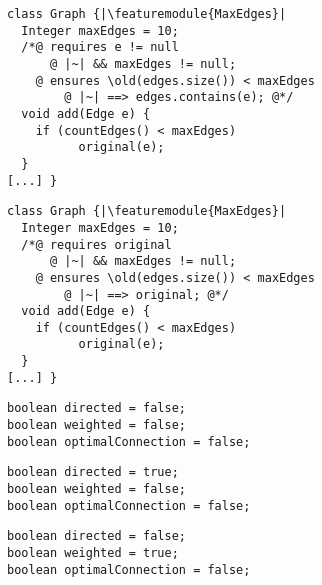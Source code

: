 \newsavebox{\ecrmaxco}
\begin{lrbox}{\ecrmaxco}
	\begin{minipage}{62mm}
\begin{lstlisting}
class Graph {|\featuremodule{MaxEdges}|
  Integer maxEdges = 10;
  /*@ requires e != null
	  @ |~| && maxEdges != null;
    @ ensures \old(edges.size()) < maxEdges
		@ |~| ==> edges.contains(e); @*/
  void add(Edge e) {
    if (countEdges() < maxEdges)
		  original(e);
  }
[...] }
\end{lstlisting}
	\end{minipage}
\end{lrbox}

\newsavebox{\ecrmax}
\begin{lrbox}{\ecrmax}
	\begin{minipage}{62mm}
\begin{lstlisting}
class Graph {|\featuremodule{MaxEdges}|
  Integer maxEdges = 10;
  /*@ requires original
	  @ |~| && maxEdges != null;
    @ ensures \old(edges.size()) < maxEdges
		@ |~| ==> original; @*/
  void add(Edge e) {
    if (countEdges() < maxEdges)
		  original(e);
  }
[...] }
\end{lstlisting}
	\end{minipage}
\end{lrbox}


\newsavebox{\variables}
\begin{lrbox}{\variables}
	\begin{minipage}{50mm}
\begin{lstlisting}
boolean directed = false;
boolean weighted = false;
boolean optimalConnection = false;
\end{lstlisting}
	\end{minipage}
\end{lrbox}

\newsavebox{\variablesd}
\begin{lrbox}{\variablesd}
	\begin{minipage}{50mm}
\begin{lstlisting}
boolean directed = true;
boolean weighted = false;
boolean optimalConnection = false;
\end{lstlisting}
	\end{minipage}
\end{lrbox}

\newsavebox{\variablesw}
\begin{lrbox}{\variablesw}
	\begin{minipage}{50mm}
\begin{lstlisting}
boolean directed = false;
boolean weighted = true;
boolean optimalConnection = false;
\end{lstlisting}
	\end{minipage}
\end{lrbox}

